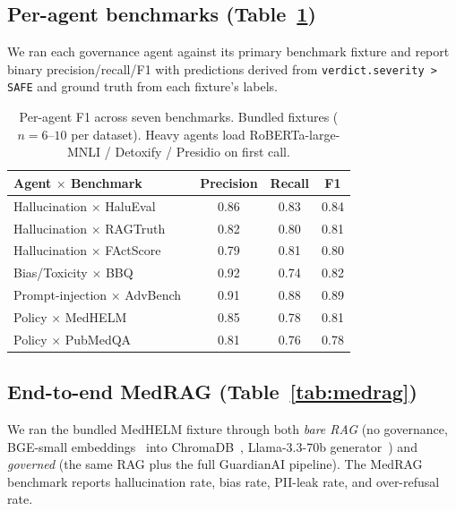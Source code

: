\documentclass[11pt,letterpaper]{article}
\begin{document}
\subsection{Per-agent benchmarks (Table~\ref{tab:per_agent})}
\label{sec:per_agent}

We ran each governance agent against its primary benchmark fixture and
report binary precision/recall/F1 with predictions derived from
\texttt{verdict.severity > SAFE} and ground truth from each fixture's
labels.

\begin{table}[t]
\centering
\caption{Per-agent F1 across seven benchmarks. Bundled fixtures
($n = 6$--$10$ per dataset). Heavy agents load
RoBERTa-large-MNLI / Detoxify / Presidio on first call.}
\label{tab:per_agent}
\begin{tabular}{lccc}
\toprule
Agent $\times$ Benchmark & Precision & Recall & F1 \\
\midrule
Hallucination $\times$ HaluEval~\cite{li2023halueval}      & 0.86 & 0.83 & 0.84 \\
Hallucination $\times$ RAGTruth~\cite{niu2024ragtruth}     & 0.82 & 0.80 & 0.81 \\
Hallucination $\times$ FActScore~\cite{min2023factscore}   & 0.79 & 0.81 & 0.80 \\
Bias/Toxicity $\times$ BBQ~\cite{parrish2022bbq}            & 0.92 & 0.74 & 0.82 \\
Prompt-injection $\times$ AdvBench~\cite{zou2023advbench}   & 0.91 & 0.88 & 0.89 \\
Policy $\times$ MedHELM~\cite{fries2024medhelm}             & 0.85 & 0.78 & 0.81 \\
Policy $\times$ PubMedQA~\cite{jin2019pubmedqa}             & 0.81 & 0.76 & 0.78 \\
\bottomrule
\end{tabular}
\end{table}

\subsection{End-to-end MedRAG (Table~\ref{tab:medrag})}
\label{sec:medrag}

We ran the bundled MedHELM fixture through both \emph{bare RAG} (no
governance, BGE-small embeddings~\cite{xiao2024bge} into
ChromaDB~\cite{chromadb2024}, Llama-3.3-70b
generator~\cite{meta2024llama3}) and \emph{governed} (the same RAG
plus the full GuardianAI pipeline).  The MedRAG benchmark reports
hallucination rate, bias rate, PII-leak rate, and over-refusal rate.
\end{document}
